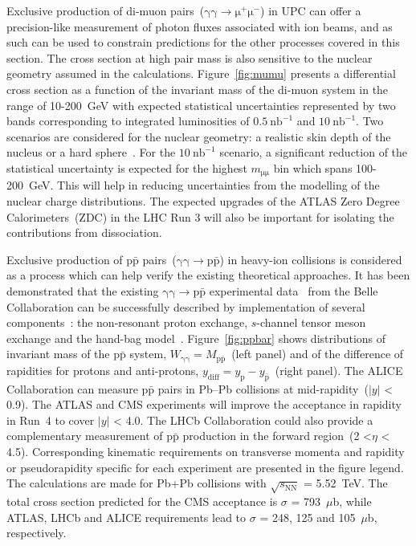 Exclusive production of di-muon pairs~($\mathrm{\gamma\gamma\rightarrow \mu^+\mu^-}$) in UPC can offer a precision-like measurement of photon fluxes associated with ion beams, and as such can be used to constrain predictions for the other processes covered in this section. The cross section at high pair mass is also sensitive to the nuclear geometry assumed in the calculations. Figure~\ref{fig:mumu} presents a differential cross section as a function of the invariant mass of the di-muon system in the range of 10-200~GeV with expected statistical uncertainties represented by two bands corresponding to integrated luminosities of $0.5~\mathrm{nb}^{-1}$ and
$10~\mathrm{nb}^{-1}$. Two scenarios are considered for the nuclear
geometry: a realistic skin depth of the nucleus or a hard sphere~\cite{Barrett:1977}.
For the $10~\mathrm{nb}^{-1}$ scenario, a significant reduction of the
statistical uncertainty is expected for the highest $m_{\mathrm{\mu\mu}}$ bin which spans 100-200~GeV.  This will help in reducing uncertainties from the modelling of the nuclear charge distributions.
The expected upgrades of the ATLAS Zero Degree Calorimeters~(ZDC) in the LHC Run 3 will also be important for isolating the contributions from dissociation.

Exclusive production of p$\mathrm{\bar{p}}$ pairs~($\mathrm{\gamma\gamma\rightarrow p\bar{p}}$) in heavy-ion collisions is considered as a process which can help verify the existing theoretical approaches. It has been demonstrated that the existing $\mathrm{\gamma\gamma\rightarrow p\bar{p}}$ experimental data~\cite{Kuo:2005nr} from the Belle Collaboration can be successfully described by implementation of several components~\cite{Klusek-Gawenda:2017lgt}: the non-resonant proton exchange, $s$-channel tensor meson exchange and the hand-bag model~\cite{Diehl:2002yh}. Figure~\ref{fig:ppbar} shows distributions of invariant mass of the p$\mathrm{\bar{p}}$ system, $W_{\mathrm{\gamma\gamma}} = M_{\mathrm{p\bar{p}}}$~(left panel) and of the difference of rapidities for protons and anti-protons, $y_{\mathrm{diff}} = y_\mathrm{p} - y_{\mathrm{\bar{p}}}$~(right panel).
The ALICE Collaboration can measure p$\mathrm{\bar{p}}$ pairs in Pb--Pb collisions at mid-rapidity~($|y|$ < 0.9). The ATLAS and CMS experiments will improve the acceptance in rapidity in Run~4 to cover $|y|$ < 4.0.
The LHCb Collaboration could also provide a complementary measurement of p$\mathrm{\bar{p}}$ production in the forward region~(2 <$\eta$ < 4.5).  Corresponding kinematic requirements on transverse momenta and rapidity or pseudorapidity specific for each experiment are presented in the figure legend. The calculations are made for Pb+Pb collisions with $\sqrt{s_{\mathrm{NN}}}$ = 5.52~TeV.
The total cross section predicted for the CMS acceptance is $\sigma$ = 793~$\mu$b, while ATLAS, LHCb and ALICE requirements lead to $\sigma$ = 248, 125 and 105~$\mu$b, respectively.


